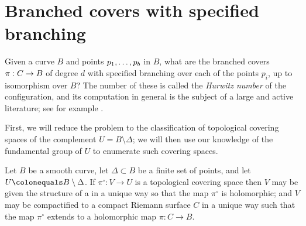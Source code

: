 \section{Branched covers with specified branching}
\label{branched covers}

Given a curve $B$ and points
$\thinmuskip=3mu plus 2mu p_1,\dots,p_b$ in $B$,
what are the branched covers $\pi :\nobreak C \to\nobreak B$
of degree $d$ with specified branching over each of the points $p_i$,
up to isomorphism over $B$?
The number of these is called
the \emph{Hurwitz number}
%
of the configuration, and its computation in
general is the subject of a large and active literature; see for example
\cite{ELSV}.

First, we will reduce the problem to the classification of topological
covering spaces of the complement $U = B \setminus \Delta$; we will
then use our knowledge of the fundamental group of $U$ to enumerate such
covering spaces.

\begin{theorem}
 Let $B$ be a smooth curve, let $\Delta\subset B$ be a finite set of
 points, and let $U \colonequals  B\setminus \Delta$.
If $\pi^\circ : V \to U$ is a topological covering space then $V$ may
be given the structure of a
%
in a unique way so that
the map $\pi^\circ$ is holomorphic; and $V$ may be compactified to a
compact Riemann surface $C$ in a unique way such that the map $\pi^\circ$
extends to a holomorphic map $\pi : C \to B$.
\unif
\end{theorem}

